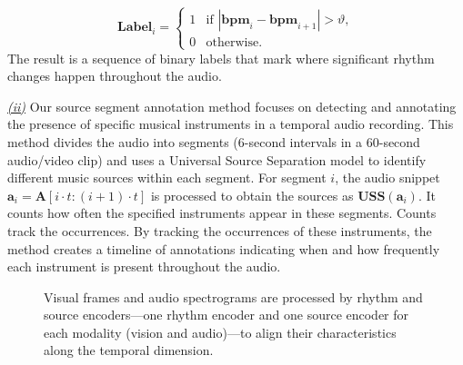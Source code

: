 \documentclass[11pt]{article}
\begin{document}
\vspace{-0.5cm}
\begin{equation}
\mathbf{Label}_i = 
\begin{cases} 
1 & \text{if } |\mathbf{bpm}_i - \mathbf{bpm}_{i+1}| > \vartheta, \\
0 & \text{otherwise}.
\end{cases}
\end{equation}
The result is a sequence of binary labels that mark where significant rhythm changes happen throughout the audio.

\underline{\textit{(ii)}} Our source segment annotation method focuses on detecting and annotating the presence of specific musical instruments in a temporal audio recording. This method divides the audio into segments (6-second intervals in a 60-second audio/video clip) and uses a Universal Source Separation model \cite{kong2023universal} to identify different music sources within each segment. For segment $i$, the audio snippet $\mathbf{a}_i = \mathbf{A}[i \cdot t : (i+1) \cdot t]$ is processed to obtain the sources as $\mathbf{USS}(\mathbf{a}_i)$.
It counts how often the specified instruments appear in these segments. Counts track the occurrences. By tracking the occurrences of these instruments, the method creates a timeline of annotations indicating when and how frequently each instrument is present throughout the audio.

\begin{figure}
\begin{center}
\end{center}
\vspace{-0.5cm}
\caption{Visual frames and audio spectrograms are processed by rhythm and source encoders—one rhythm encoder and one source encoder for each modality (vision and audio)—to align their characteristics along the temporal dimension.}

\vspace{-0.5cm}
\label{fig:predictor}
\end{figure}
\end{document}
